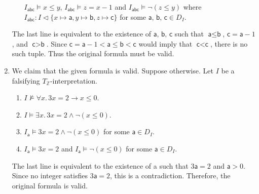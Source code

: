 \begin{exer}[3.2]
\begin{enumerate}[label=(\alph*)]
\begin{enumerate}[label=\arabic*.]
                    $I_{\textsf{abc}} \models x \leq y$, $I_{\textsf{abc}} \models z = x - 1$ and $I_{\textsf{abc}} \models \neg(z \leq y)$ where $I_{\textsf{abc}}: I \vartriangleleft \{ x \mapsto \textsf{a}, y \mapsto \textsf{b}, z \mapsto \textsf{c} \}$ for some $\textsf{a, b, c} \in D_I$.
            \end{enumerate}
            The last line is equivalent to the existence of $\textsf{a, b, c}$ such that $\textsf{a} \leq \textsf{b}$, $\textsf{c} = \textsf{a} - 1$, and $\textsf{c} > \textsf{b}$.
            Since $\textsf{c} = \textsf{a} - 1 < \textsf{a} \leq \textsf{b} < \textsf{c}$ would imply that $\textsf{c} < \textsf{c}$, there is no such tuple.
            Thus the original formula must be valid.
        \item
            We claim that the given formula is valid.
            Suppose otherwise.
            Let $I$ be a falsifying $T_{\mathbb{Z}}$-interpretation.
            \begin{enumerate}[label=\arabic*.]
                \item
                    $I \not\models \forall x.\, 3x = 2 \rightarrow x \leq 0$.
                \item
                    $I \models \exists x.\, 3x = 2 \land \neg(x \leq 0)$.
                \item
                    $I_{\textsf{a}} \models 3x = 2 \land \neg(x \leq 0)$ for some $\textsf{a} \in D_I$.
                \item
                    $I_{\textsf{a}} \models 3x = 2$ and $I_{\textsf{a}} \models \neg(x \leq 0)$ for some $\textsf{a} \in D_I$.
            \end{enumerate}
            The last line is equivalent to the existence of \textsf{a} such that $3\textsf{a} = 2$ and $\textsf{a} > 0$.
            Since no integer satisfies $3\textsf{a} = 2$, this is a contradiction.
            Therefore, the original formula is valid.
    \end{enumerate}
\end{exer}

